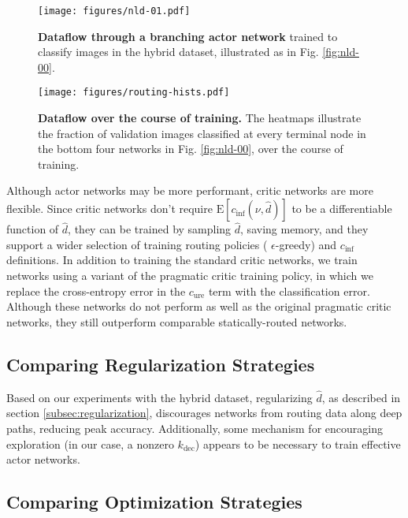 \documentclass{article}
\begin{document}
  \begin{figure}[htb]
    \centering
    \texttt{[image: figures/nld-01.pdf]}
    \caption{\textbf{Dataflow  through  a branching actor network} trained to classify images in the hybrid dataset, illustrated as in Fig. \ref*{fig:nld-00}.}
    \label{fig:nld-01}
  \end{figure}

  \begin{figure}[htb]
    \centering
    \texttt{[image: figures/routing-hists.pdf]}
    \caption{\textbf{Dataflow over the course of training.} The heatmaps illustrate the fraction of validation images classified at every terminal node in the bottom four networks in Fig. \ref*{fig:nld-00}, over the course of training.}
    \label{fig:routing-hists}
  \end{figure}

  Although actor networks may be more performant, critic networks are more flexible. Since critic networks don't require $\mathrm{E}[c_\text{inf}(\nu,\hat{d})]$ to be a differentiable function of $\hat{d}$, they can be trained by sampling $\hat{d}$, saving memory, and they support a wider selection of training routing policies ( $\epsilon$-greedy) and $c_\text{inf}$ definitions. In addition to training the standard critic networks, we train networks using a variant of the pragmatic critic training policy, in which we replace the cross-entropy error in the $c_\text{ure}$ term with the classification error. Although these networks do not perform as well as the original pragmatic critic networks, they still outperform comparable statically-routed networks.

  \subsection{Comparing Regularization Strategies}

  Based on our experiments with the hybrid dataset, regularizing $\hat{d}$, as described in section \ref*{subsec:regularization}, discourages networks from routing data along deep paths, reducing peak accuracy. Additionally, some mechanism for encouraging exploration (in our case, a nonzero $k_\text{dec}$) appears to be necessary to train effective actor networks.
  
  \subsection{Comparing Optimization Strategies}
\end{document}
